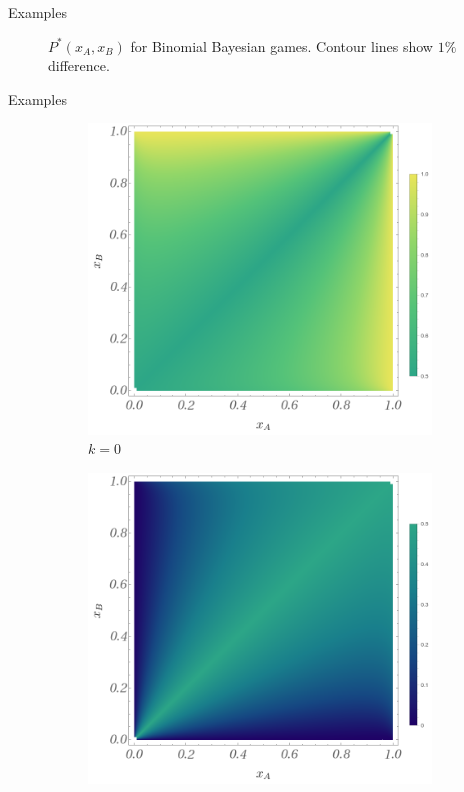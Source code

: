 \documentclass{beamer}
\theoremstyle{definition}
\begin{document}
\begin{frame}{Examples}
\begin{figure}[H]
    \caption{\small \centering $P^*(x_A,x_B)$ for Binomial Bayesian games. Contour lines show $1\%$ difference.}
    \label{fig:P_InfBG_1_2}
\end{figure}

\end{frame}

\begin{frame}{Examples}

    \begin{figure}[H]
    \centering
    \begin{subfigure}[b]{0.4\textwidth}
        \includegraphics[width=\textwidth]{img/BinomialBayesian_ppk_1_0.png}
        \caption{\small \centering $k=0$}
        \label{fig:ppkBG_1_0}
    \end{subfigure}
    \hspace{0.05\textwidth} %
    \begin{subfigure}[b]{0.4\textwidth}
        \includegraphics[width=\textwidth]{img/BinomialBayesian_ppk_1_1.png}

\end{subfigure}
\end{figure}
\end{frame}
\end{document}
